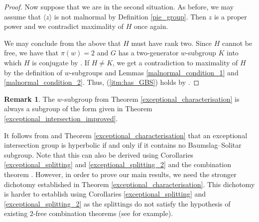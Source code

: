 \documentclass[11pt, a4paper]{amsart}
\theoremstyle{definition}
\newtheorem{remark}[theorem]{Remark}
\begin{document}
\begin{proof}
Now suppose that we are in the second situation. As before, we may assume that $\langle z\rangle$ is not malnormal by Definition \ref{pie_group}. Then $z$ is a proper power and we contradict maximality of $H$ once again. 

We may conclude from the above that $H$ must have rank two. Since $H$ cannot be free, we have that $\pi(w) = 2$ and $G$ has a two-generator $w$-subgroup $K$ into which $H$ is conjugate by \cite[Corollary 1.10]{louder_21}. If $H\neq K$, we get a contradiction to maximality of $H$ by the definition of $w$-subgroups and Lemmas \ref{malnormal_condition_1} and \ref{malnormal_condition_2}. Thus, (\ref{itm:has_GBS}) holds by \cite[Corollary 1.10]{louder_21}.
\end{proof}

\begin{remark}
\label{w_subgroup_remark}
The $w$-subgroup from Theorem \ref{exceptional_characterisation} is always a subgroup of the form given in Theorem \ref{exceptional_intersection_improved}.
\end{remark}

It follows from \cite[Theorem 8.2]{me_22} and Theorem \ref{exceptional_characterisation} that an exceptional intersection group is hyperbolic if and only if it contains no Baumslag--Solitar subgroup. Note that this can also be derived using Corollaries \ref{exceptional_splitting} and \ref{exceptional_splitting_2} and the combination theorem \cite{bestvina_92_combination}. However, in order to prove our main results, we need the stronger dichotomy established in Theorem \ref{exceptional_characterisation}. This dichotomy is harder to establish using Corollaries \ref{exceptional_splitting} and \ref{exceptional_splitting_2} as the splittings do not satisfy the hypothesis of existing $2$-free combination theorems (see \cite{bbaumslag_68} for example).
\end{document}
